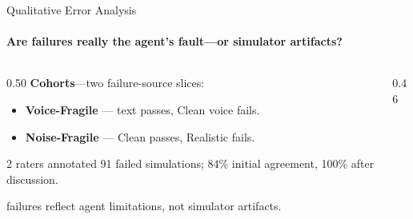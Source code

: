 \documentclass[aspectratio=169]{beamer}
\begin{document}
\begin{frame}{Qualitative Error Analysis}
  \framesubtitle{Are failures really the agent's fault---or simulator artifacts?}

  \begin{columns}[T]
    \begin{column}{0.50\textwidth}
      \textbf{Cohorts}---two failure-source slices:
      \begin{itemize}
        \item \textbf{Voice-Fragile} --- text passes, Clean voice fails.
        \item \textbf{Noise-Fragile} --- Clean passes, Realistic fails.
      \end{itemize}

      \vspace{0.3em}
      {\small 2 raters annotated 91 failed simulations; 84\% initial agreement, 100\% after discussion.}

      \vspace{0.4em}
      \textcolor{SierraOrange}{} failures reflect agent limitations, not simulator artifacts.
    \end{column}
    \begin{column}{0.46\textwidth}
      \vspace{-0.2em}
    \end{column}
  \end{columns}

\end{frame}
\end{document}
